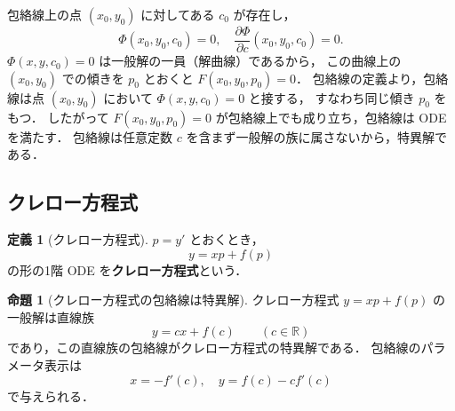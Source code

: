 \documentclass[dvipdfmx,a4paper,12pt]{jsarticle}
\makeatletter
\theoremstyle{definition}
\newtheorem{definition}[theorem]{定義}
\newtheorem{proposition}[theorem]{命題}
\renewcommand{\proofname}{証明}
\renewenvironment{proof}[1][\proofname]{%
  \par\pushQED{\qed}%
  \normalfont \topsep6\p@\@plus6\p@\relax
  \trivlist
  \item[\hskip\labelsep\bfseries#1\@addpunct{.}]\ignorespaces
}{%
  \popQED\endtrivlist\@endpefalse
}
\makeatother
\begin{document}
\begin{proof}
    包絡線上の点 $(x_0,y_0)$ に対してある $c_0$ が存在し，
    \begin{equation*}
        \Phi(x_0,y_0,c_0)=0,\quad
        \frac{\partial\Phi}{\partial c}(x_0,y_0,c_0)=0.
    \end{equation*}
    $\Phi(x,y,c_0)=0$ は一般解の一員（解曲線）であるから，
    この曲線上の $(x_0,y_0)$ での傾きを $p_0$ とおくと $F(x_0,y_0,p_0)=0$．
    包絡線の定義より，包絡線は点 $(x_0,y_0)$ において $\Phi(x,y,c_0)=0$ と接する，
    すなわち同じ傾き $p_0$ をもつ．
    したがって $F(x_0,y_0,p_0)=0$ が包絡線上でも成り立ち，包絡線は ODE を満たす．
    包絡線は任意定数 $c$ を含まず一般解の族に属さないから，特異解である．
\end{proof}

\subsection{クレロー方程式}

\begin{definition}[クレロー方程式]
    $p=y'$ とおくとき，
    \begin{equation*}
        y = xp + f(p)
    \end{equation*}
    の形の1階 ODE を\textbf{クレロー方程式}という．
\end{definition}

\begin{proposition}[クレロー方程式の包絡線は特異解]
    クレロー方程式 $y=xp+f(p)$ の一般解は直線族
    \begin{equation*}
        y = cx + f(c) \qquad (c\in\mathbb{R})
    \end{equation*}
    であり，この直線族の包絡線がクレロー方程式の特異解である．
    包絡線のパラメータ表示は
    \begin{equation*}
        x = -f'(c),\quad y = f(c) - cf'(c)
    \end{equation*}
    で与えられる．
\end{proposition}
\end{document}
